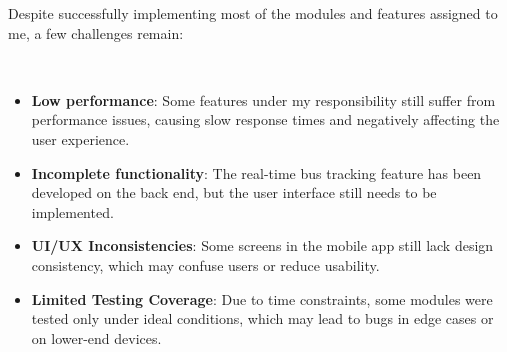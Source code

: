 \begin{minipage}{\textwidth}
    \setlength{\parindent}{2em}
    Despite successfully implementing most of the modules and features assigned to me, a few challenges remain:
\end{minipage}\\
\vspace{-0.4cm}
\begin{itemize}[itemsep=-0.05cm]
    \item \textbf{Low performance}: Some features under my responsibility still suffer from performance issues, causing slow response times and negatively affecting the user experience.
    \item \textbf{Incomplete functionality}: The real-time bus tracking feature has been developed on the back end, but the user interface still needs to be implemented.
    \item \textbf{UI/UX Inconsistencies}: Some screens in the mobile app still lack design consistency, which may confuse users or reduce usability.
    \item \textbf{Limited Testing Coverage}: Due to time constraints, some modules were tested only under ideal conditions, which may lead to bugs in edge cases or on lower-end devices.
\end{itemize}




